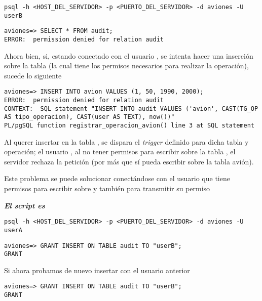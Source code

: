 \vspace*{5mm}
\lstset{style=bash}
\begin{lstlisting}
psql -h <HOST_DEL_SERVIDOR> -p <PUERTO_DEL_SERVIDOR> -d aviones -U userB
\end{lstlisting}

\lstset{style=sql}
\begin{lstlisting}
aviones=> SELECT * FROM audit;
ERROR:  permission denied for relation audit
\end{lstlisting}

Ahora bien, si, estando conectado con el usuario , se intenta hacer una inserción sobre la tabla  (la cual tiene los permisos necesarios para realizar la operación), sucede lo siguiente

\lstset{style=sql}
\begin{lstlisting}
aviones=> INSERT INTO avion VALUES (1, 50, 1990, 2000);
ERROR:  permission denied for relation audit
CONTEXT:  SQL statement "INSERT INTO audit VALUES ('avion', CAST(TG_OP AS tipo_operacion), CAST(user AS TEXT), now())"
PL/pgSQL function registrar_operacion_avion() line 3 at SQL statement
\end{lstlisting}

Al querer insertar en la tabla , se dispara el \emph{trigger} definido para dicha tabla y operación; el usuario , al no tener permisos para escribir sobre la tabla , el servidor rechaza la petición (por más que sí pueda escribir sobre la tabla avión).

Este problema se puede solucionar conectándose con el usuario  que tiene permisos para escribir sobre  y también para transmitir su permiso

\emph{\textbf{El script es }} 

\vspace*{5mm}
\lstset{style=bash}
\begin{lstlisting}
psql -h <HOST_DEL_SERVIDOR> -p <PUERTO_DEL_SERVIDOR> -d aviones -U userA
\end{lstlisting}

\lstset{style=bash}
\begin{lstlisting}
aviones=> GRANT INSERT ON TABLE audit TO "userB";
GRANT
\end{lstlisting}

Si ahora probamos de nuevo insertar con el usuario anterior

\vspace*{5mm}
\lstset{style=sql}
\begin{lstlisting}
aviones=> GRANT INSERT ON TABLE audit TO "userB";
GRANT
\end{lstlisting}

